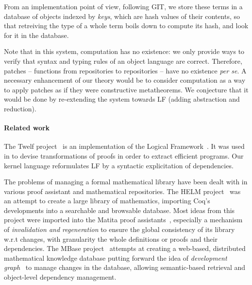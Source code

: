 \documentclass{article}
\begin{document}
From an implementation point of view, following \textsf{GIT}, we store
these terms in a database of objects indexed by \emph{keys}, which are
hash values of their contents, so that retreiving the type of a whole
term boils down to compute its hash, and look for it in the database.

Note that in this system, computation has no existence: we only
provide ways to verify that syntax and typing rules of an object
language are correct. Therefore, patches -- functions from
repositories to repositories -- have no existence \emph{per se}. A
necessary enhancement of our theory would be to consider computation
as a way to apply patches as if they were constructive
metatheorems. We conjecture that it would be done by re-extending the
system towards LF (adding abstraction and reduction).

\paragraph{Related work}
\label{rw}

The \textsf{Twelf} project~\citep{pfenning1999system} is an
implementation of the Logical
Framework~\citep{harper1993framework}. It was used in
\citep{anderson1993program} to devise transformations of proofs in
order to extract efficient programs. Our kernel language reformulates
LF by a syntactic explicitation of dependencies.

The problems of managing a formal mathematical library have been dealt
with in various proof assistant and mathematical repositories. The
HELM project~\citep{asperti2006content} was an attempt to create a
large library of mathematics, importing \textsf{Coq}'s developments
into a searchable and browsable database.  Most ideas from this
project were imported into the \textsf{Matita} proof
assistants~\citep{AspertiCTZ07}, especially a mechanism of
\emph{invalidation and regeneration} to ensure the global consistency
of its library w.r.t changes, with granularity the whole definitions
or proofs and their dependencies. The MBase
project~\citep{kohlhase2001mbase} attempts at creating a web-based,
distributed mathematical knowledge database putting forward the idea
of \emph{development
  graph}~\citep{hutter2000management,autexier2000towards} to manage
changes in the database, allowing semantic-based retrieval and
object-level dependency management. 
\end{document}
